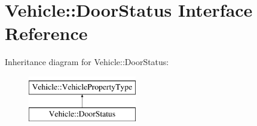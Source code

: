 \hypertarget{interfaceVehicle_1_1DoorStatus}{\section{Vehicle\-:\-:Door\-Status Interface Reference}
\label{interfaceVehicle_1_1DoorStatus}
}
Inheritance diagram for Vehicle\-:\-:Door\-Status\-:\begin{figure}[H]
\begin{center}
\leavevmode
\includegraphics[height=2.000000cm]{interfaceVehicle_1_1DoorStatus}
\end{center}
\end{figure}
